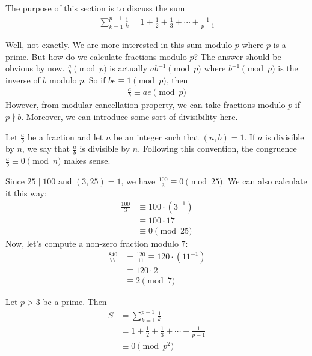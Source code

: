 The purpose of this section is to discuss the sum
	\begin{align*}
		\sum_{k=1}^{p-1} \frac{1}{k} = 1+\frac{1}{2}+ \frac{1}{3}+\cdots+ \frac{1}{p-1}
	\end{align*}

Well, not exactly. We are more interested in this sum modulo $p$ where $p$ is a prime. But how do we calculate fractions modulo $p$? The answer should be obvious by now. $\frac{a}{b}\pmod p$ is actually $ab^{-1}\pmod p$ where $b^{-1}\pmod p$ is the inverse of $b$ modulo $p$. So if $be\equiv1\pmod p$, then
	\begin{align*}
		\frac{a}{b}\equiv ae\pmod p
	\end{align*}
However, from modular cancellation property, we can take fractions modulo $p$ if $p\nmid b$. Moreover, we can introduce some sort of divisibility here.

Let $ \frac{a}{b}$ be a fraction and let $n$ be an integer such that $(n,b)=1$. If $a$ is divisible by $n$, we say that $ \frac{a}{b}$ is divisible by $n$. Following this convention, the congruence $\frac{a}{b} \equiv 0 \pmod n$ makes sense.
	\begin{example}
		Since $25 \mid 100$ and $(3,25)=1$, we have $\frac{100}{3} \equiv 0 \pmod{25}$. We can also calculate it this way:
			\begin{align*}
				\frac{100}{3}   &\equiv 100 \cdot (3^{-1}) \\
				&\equiv 100 \cdot 17\\
				&\equiv 0 \pmod{25}
			\end{align*}
		Now, let's compute a non-zero fraction modulo $7$:
			\begin{align*}
				\frac{840}{77} &= \frac{120}{11} \equiv 120 \cdot (11^{-1})\\
				&\equiv 120 \cdot 2 \\
				& \equiv 2 \pmod{7}
			\end{align*}
	\end{example}


	\begin{theorem}\label{thm:wolst}
		Let $p>3$ be a prime. Then
		\begin{align*}
			S
				& = \sum_{k=1}^{p-1} \frac{1}{k}\\
				& = 1+\frac{1}{2}+ \frac{1}{3}+\cdots+ \frac{1}{p-1}\\
				& \equiv 0 \pmod{p^2}
		\end{align*}
	\end{theorem}

